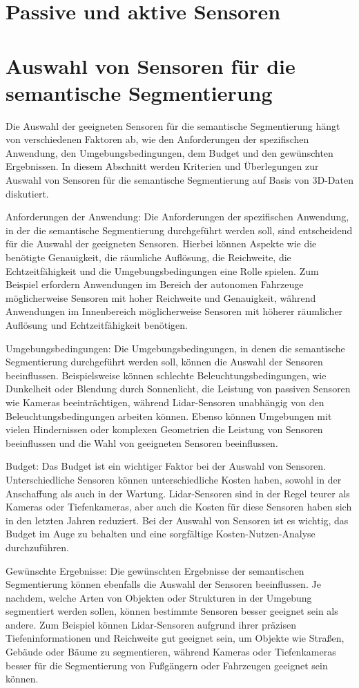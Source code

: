 \section{Passive und aktive Sensoren}


\section{Auswahl von Sensoren für die semantische Segmentierung}

Die Auswahl der geeigneten Sensoren für die semantische Segmentierung hängt von
verschiedenen Faktoren ab, wie den Anforderungen der spezifischen Anwendung,
den Umgebungsbedingungen, dem Budget und den gewünschten Ergebnissen. In diesem
Abschnitt werden Kriterien und Überlegungen zur Auswahl von Sensoren für die
semantische Segmentierung auf Basis von 3D-Daten diskutiert.

Anforderungen der Anwendung: Die Anforderungen der spezifischen Anwendung, in
der die semantische Segmentierung durchgeführt werden soll, sind entscheidend
für die Auswahl der geeigneten Sensoren. Hierbei können Aspekte wie die
benötigte Genauigkeit, die räumliche Auflösung, die Reichweite, die
Echtzeitfähigkeit und die Umgebungsbedingungen eine Rolle spielen. Zum Beispiel
erfordern Anwendungen im Bereich der autonomen Fahrzeuge möglicherweise
Sensoren mit hoher Reichweite und Genauigkeit, während Anwendungen im
Innenbereich möglicherweise Sensoren mit höherer räumlicher Auflösung und
Echtzeitfähigkeit benötigen.

Umgebungsbedingungen: Die Umgebungsbedingungen, in denen die semantische
Segmentierung durchgeführt werden soll, können die Auswahl der Sensoren
beeinflussen. Beispielsweise können schlechte Beleuchtungsbedingungen, wie
Dunkelheit oder Blendung durch Sonnenlicht, die Leistung von passiven Sensoren
wie Kameras beeinträchtigen, während Lidar-Sensoren unabhängig von den
Beleuchtungsbedingungen arbeiten können. Ebenso können Umgebungen mit vielen
Hindernissen oder komplexen Geometrien die Leistung von Sensoren beeinflussen
und die Wahl von geeigneten Sensoren beeinflussen.

Budget: Das Budget ist ein wichtiger Faktor bei der Auswahl von Sensoren.
Unterschiedliche Sensoren können unterschiedliche Kosten haben, sowohl in der
Anschaffung als auch in der Wartung. Lidar-Sensoren sind in der Regel teurer
als Kameras oder Tiefenkameras, aber auch die Kosten für diese Sensoren haben
sich in den letzten Jahren reduziert. Bei der Auswahl von Sensoren ist es
wichtig, das Budget im Auge zu behalten und eine sorgfältige
Kosten-Nutzen-Analyse durchzuführen.

Gewünschte Ergebnisse: Die gewünschten Ergebnisse der semantischen
Segmentierung können ebenfalls die Auswahl der Sensoren beeinflussen. Je
nachdem, welche Arten von Objekten oder Strukturen in der Umgebung segmentiert
werden sollen, können bestimmte Sensoren besser geeignet sein als andere. Zum
Beispiel können Lidar-Sensoren aufgrund ihrer präzisen Tiefeninformationen und
Reichweite gut geeignet sein, um Objekte wie Straßen, Gebäude oder Bäume zu
segmentieren, während Kameras oder Tiefenkameras besser für die Segmentierung
von Fußgängern oder Fahrzeugen geeignet sein können.
